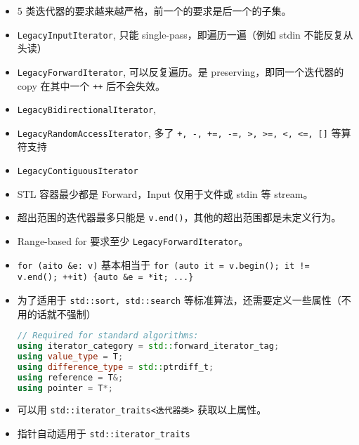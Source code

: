 
\begin{itemize}
\item 5 类迭代器的要求越来越严格，前一个的要求是后一个的子集。
\item \verb`LegacyInputIterator`, 只能 single-pass，即遍历一遍（例如 stdin 不能反复从头读）
\item \verb`LegacyForwardIterator`, 可以反复遍历。是 preserving，即同一个迭代器的 copy 在其中一个 \verb`++` 后不会失效。
\item \verb`LegacyBidirectionalIterator`,
\item \verb`LegacyRandomAccessIterator`, 多了 \verb`+, -, +=, -=, >, >=, <, <=, []` 等算符支持
\item \verb`LegacyContiguousIterator`
\item STL 容器最少都是 Forward，Input 仅用于文件或 stdin 等 stream。
\item 超出范围的迭代器最多只能是 \verb`v.end()`，其他的超出范围都是未定义行为。
\item Range-based for 要求至少 \verb`LegacyForwardIterator`。
\item \verb`for (aito &e: v)` 基本相当于 \verb`for (auto it = v.begin(); it != v.end(); ++it) {auto &e = *it; ...}`
\item 为了适用于 \verb`std::sort, std::search` 等标准算法，还需要定义一些属性（不用的话就不强制）
\begin{lstlisting}[language=cpp]
// Required for standard algorithms:
using iterator_category = std::forward_iterator_tag;
using value_type = T;
using difference_type = std::ptrdiff_t;
using reference = T&;
using pointer = T*;
\end{lstlisting}
\item 可以用 \verb`std::iterator_traits<迭代器类>` 获取以上属性。
\item 指针自动适用于 \verb`std::iterator_traits`
\end{itemize}
